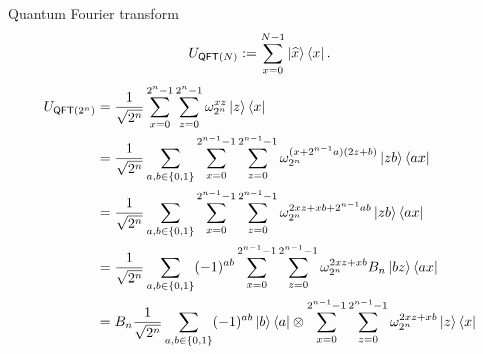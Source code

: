 \documentclass{beamer}
\begin{document}
\begin{frame}{Quantum Fourier transform}
\small
\vspace{-1em}
\begin{align*}
U_{\mathsf{QFT}(N)} := \sum_{x=0}^{N-1}\ket{\widehat{x}}\bra{x}.
\end{align*}
\begin{align*}
U_{\mathsf{QFT}(2^n)} &= \frac1{\sqrt{2^{n}}}\sum_{x=0}^{2^n-1}\sum_{z=0}^{2^n-1}\omega_{2^n}^{xz}\ket{z}\bra{x}\\
&= \frac1{\sqrt{2^{n}}}\sum_{a,b\in\{0,1\}}\sum_{x=0}^{2^{n-1}-1}\sum_{z=0}^{2^{n-1}-1}\omega_{2^n}^{(x+2^{n-1}a)(2z+b)}\ket{zb}\bra{ax}\\
&= \frac1{\sqrt{2^{n}}}\sum_{a,b\in\{0,1\}}\sum_{x=0}^{2^{n-1}-1}\sum_{z=0}^{2^{n-1}-1}\omega_{2^n}^{2xz + xb + 2^{n-1}ab}\ket{zb}\bra{ax}\\
&= \frac1{\sqrt{2^{n}}}\sum_{a,b\in\{0,1\}}(-1)^{ab}\sum_{x=0}^{2^{n-1}-1}\sum_{z=0}^{2^{n-1}-1}\omega_{2^n}^{2xz + xb}B_n\ket{bz}\bra{ax}\\
&= B_n\frac1{\sqrt{2^{n}}}\sum_{a,b\in\{0,1\}}(-1)^{ab}\ket{b}\bra{a}\otimes \sum_{x=0}^{2^{n-1}-1}\sum_{z=0}^{2^{n-1}-1}\omega_{2^n}^{2xz + xb}\ket{z}\bra{x}\\
\end{align*}
\end{frame}
\end{document}
